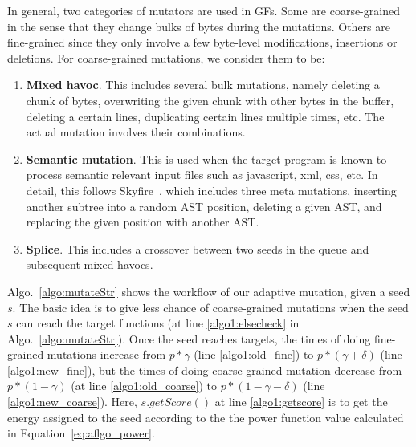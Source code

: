 In general, two categories of mutators are used in GFs. Some are coarse-grained in the sense that they change bulks of bytes during the mutations. Others are fine-grained since they only involve a few byte-level modifications, insertions or deletions. For coarse-grained mutations, we consider them to be:
\begin{enumerate}[(1)] 
	\item \textbf{Mixed havoc}. This includes several bulk mutations, namely deleting a chunk of bytes, overwriting the given chunk with other bytes in the buffer, deleting a certain lines, duplicating certain lines multiple times, etc. The actual mutation involves their combinations.
	\item \textbf{Semantic mutation}. This is used when the target program is known to process semantic relevant input files such as javascript, xml, css, etc. In detail, this follows Skyfire~\cite{junjie:2017sp:skyfire}, which includes three meta mutations, inserting another subtree into a random AST position, deleting a given AST, and replacing the given position with another AST.
	\item \textbf{Splice}. This includes a crossover between two seeds in the queue and subsequent mixed havocs.
\end{enumerate}


Algo.~\ref{algo:mutateStr} shows the workflow of our adaptive mutation, given a seed $s$. 
The basic idea is to give less chance of coarse-grained mutations when the seed $s$ can reach the target functions (at line \ref{algo1:elsecheck} in Algo.~\ref{algo:mutateStr}). Once the seed reaches targets, the times of doing fine-grained mutations increase from  $ p * 	\gamma$ (line \ref{algo1:old_fine}) to $p *(	\gamma + \delta)$ (line \ref{algo1:new_fine}), but the times of doing coarse-grained mutation decrease from  $ p *(1- 	\gamma )$ (at line \ref{algo1:old_coarse}) to $p *(1- 	\gamma -\delta )$ (line \ref{algo1:new_coarse}). Here, $s.getScore()$ at line \ref{algo1:getscore} is to get the energy assigned to the seed according to the the power function value calculated in Equation~\ref{eq:aflgo_power}.

